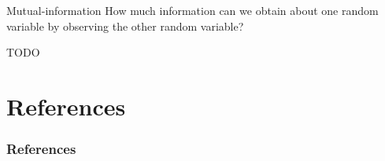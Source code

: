 \documentclass[10pt,aspectratio=1610]{beamer}
\begin{document}
\begin{frame}{Mutual-information}
	\vspace*{\fill}
	How much information can we obtain about one random variable by observing the other random variable?
	\vspace*{\fill}
	\begin{definition}
		TODO
	\end{definition}
\end{frame}

\section{References}
\begin{frame}[allowframebreaks]
	\frametitle{References}
	\nocite{*}
	\printbibliography[heading=none]
\end{frame}
\end{document}
